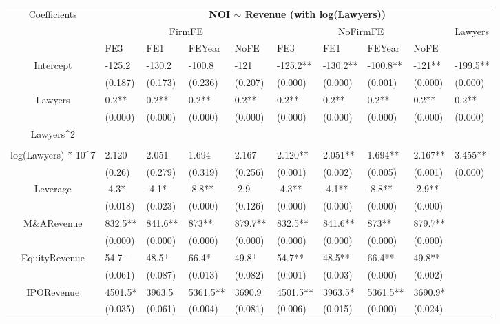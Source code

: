 \documentclass{article}
\begin{document}
\begin{table}[H]
\centering
\begin{tabular}{|clllllllll|}
\hline
\multirow{3}{*}{Coefficients} & \multicolumn{9}{c|}{\textbf{NOI $\sim$ Revenue (with log(Lawyers))}} \\
\cline{2-10}
& \multicolumn{4}{c}{FirmFE} & \multicolumn{4}{c}{NoFirmFE} & \multirow{2}{*}{Lawyers} \\
\cline{2-9}
& FE3 & FE1 & FEYear & NoFE & FE3 & FE1 & FEYear & NoFE &  \\
\hline
 
Intercept & -125.2 & -130.2 & -100.8 & -121 & -125.2** & -130.2** & -100.8** & -121** & -199.5** \\ 
   & (0.187) & (0.173) & (0.236) & (0.207) & (0.000) & (0.000) & (0.001) & (0.000) & (0.000) \\ 
  Lawyers & 0.2** & 0.2** & 0.2** & 0.2** & 0.2** & 0.2** & 0.2** & 0.2** & 0.2** \\ 
   & (0.000) & (0.000) & (0.000) & (0.000) & (0.000) & (0.000) & (0.000) & (0.000) & (0.000) \\ 
  Lawyers^2 &  &  &  &  &  &  &  &  &  \\ 
   &  &  &  &  &  &  &  &  &  \\ 
  log(Lawyers) * 10^7 & 2.120 & 2.051 & 1.694 & 2.167 & 2.120** & 2.051** & 1.694** & 2.167** & 3.455** \\ 
   & (0.26) & (0.279) & (0.319) & (0.256) & (0.001) & (0.002) & (0.005) & (0.001) & (0.000) \\ 
  Leverage & -4.3* & -4.1* & -8.8** & -2.9 & -4.3** & -4.1** & -8.8** & -2.9** &  \\ 
   & (0.018) & (0.023) & (0.000) & (0.126) & (0.000) & (0.000) & (0.000) & (0.000) &  \\ 
  M\&ARevenue & 832.5** & 841.6** & 873** & 879.7** & 832.5** & 841.6** & 873** & 879.7** &  \\ 
   & (0.000) & (0.000) & (0.000) & (0.000) & (0.000) & (0.000) & (0.000) & (0.000) &  \\ 
  EquityRevenue & 54.7$^{+}$ & 48.5$^{+}$ & 66.4* & 49.8$^{+}$ & 54.7** & 48.5** & 66.4** & 49.8** &  \\ 
   & (0.061) & (0.087) & (0.013) & (0.082) & (0.001) & (0.003) & (0.000) & (0.002) &  \\ 
  IPORevenue & 4501.5* & 3963.5$^{+}$ & 5361.5** & 3690.9$^{+}$ & 4501.5** & 3963.5* & 5361.5** & 3690.9* &  \\ 
   & (0.035) & (0.061) & (0.004) & (0.081) & (0.006) & (0.015) & (0.000) & (0.024) &  \\ 

\end{tabular}
\end{table}
\end{document}
